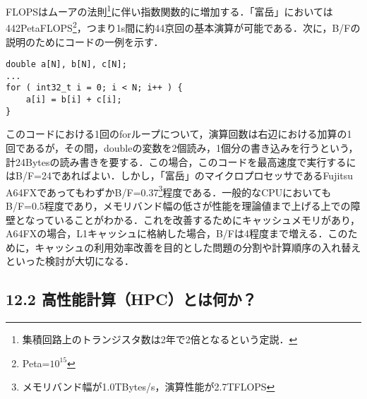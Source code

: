\documentclass[dvipdfmx, A4j, twocolumn, 10.5pt]{jsarticle}
\begin{document}
FLOPSはムーアの法則\footnote{集積回路上のトランジスタ数は2年で2倍となるという定説．}に伴い指数関数的に増加する．「富岳」においては442PetaFLOPS\footnote{Peta=$10^15$}，つまり1s間に約44京回の基本演算が可能である．次に，B/Fの説明のためにコードの一例を示す．

\begin{lstlisting}[caption=double型変数の1回の四則演算, label=c_example]
double a[N], b[N], c[N];
...
for ( int32_t i = 0; i < N; i++ ) {
    a[i] = b[i] + c[i];
}
\end{lstlisting}

このコードにおける1回のforループについて，演算回数は右辺における加算の1回であるが，その間，doubleの変数を2個読み，1個分の書き込みを行うという，計24Bytesの読み書きを要する．この場合，このコードを最高速度で実行するにはB/F=24であればよい．しかし，「富岳」のマイクロプロセッサであるFujitsu A64FXであってもわずかB/F=0.37\footnote{メモリバンド幅が1.0TBytes/s，演算性能が2.7TFLOPS}程度である．一般的なCPUにおいてもB/F=0.5程度であり，メモリバンド幅の低さが性能を理論値まで上げる上での障壁となっていることがわかる．これを改善するためにキャッシュメモリがあり，A64FXの場合，L1キャッシュに格納した場合，B/Fは4程度まで増える．このために，キャッシュの利用効率改善を目的とした問題の分割や計算順序の入れ替えといった検討が大切になる．



\subsection*{12.2 高性能計算（HPC）とは何か？}
\end{document}
